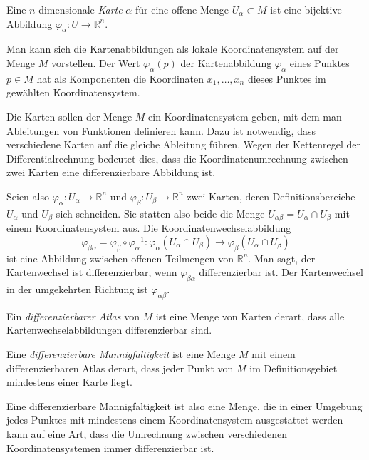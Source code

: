 \begin{definition}
\label{buch:gruppen:gruppe:def:karte}
Eine $n$-dimensionale {\em Karte} $\alpha$ für eine offene Menge
$U_\alpha\subset M$ ist eine bijektive Abbildung
$\varphi_\alpha\colon U\to \mathbb{R}^n$.
\end{definition}

Man kann sich die Kartenabbildungen als lokale Koordinatensystem auf der
Menge $M$ vorstellen.
Der Wert $\varphi_\alpha(p)$ der Kartenabbildung $\varphi_\alpha$
eines Punktes $p\in M$ hat als Komponenten die Koordinaten $x_1,\dots,x_n$
dieses Punktes im gewählten Koordinatensystem.

Die Karten sollen der Menge $M$ ein Koordinatensystem geben, mit dem
man Ableitungen von Funktionen definieren kann.
Dazu ist notwendig, dass verschiedene Karten auf die gleiche
Ableitung führen.
Wegen der Kettenregel der Differentialrechnung bedeutet dies, dass
die Koordinatenumrechnung zwischen zwei Karten eine differenzierbare
Abbildung ist.

Seien also
$\varphi_\alpha\colon U_\alpha \to \mathbb{R}^n$
und
$\varphi_\beta\colon U_\beta \to \mathbb{R}^n$
zwei Karten, deren Definitionsbereiche $U_\alpha$ und $U_\beta$ sich
schneiden.
Sie statten also beide die Menge $U_{\alpha\beta}=U_\alpha\cap U_\beta$
mit einem Koordinatensystem aus.
Die Koordinatenwechselabbildung
\[
\varphi_{\beta\alpha}
=
\varphi_\beta
\circ
\varphi_\alpha^{-1}
\colon
\varphi_\alpha(U_\alpha\cap U_\beta)
\to
\varphi_\beta(U_\alpha\cap U_\beta)
\]
ist eine Abbildung zwischen offenen Teilmengen von $\mathbb{R}^n$.
Man sagt, der Kartenwechsel ist differenzierbar, wenn $\varphi_{\beta\alpha}$
differenzierbar ist.
Der Kartenwechsel in der umgekehrten Richtung ist $\varphi_{\alpha\beta}$.

\begin{definition}
\label{buch:gruppen:gruppe:def:atlas}
Ein {\em differenzierbarer Atlas} von $M$ ist eine Menge von Karten derart,
dass alle Kartenwechselabbildungen differenzierbar sind.
\end{definition}

\begin{definition}
\label{buch:gruppen:gruppe:def:diffman}
Eine {\em differenzierbare Mannigfaltigkeit} ist eine Menge $M$ mit einem
differenzierbaren Atlas derart, dass jeder Punkt von $M$ im
Definitionsgebiet mindestens einer Karte liegt.
\end{definition}

Eine differenzierbare Mannigfaltigkeit ist also eine Menge, die in
einer Umgebung jedes Punktes mit mindestens einem Koordinatensystem
ausgestattet werden kann auf eine Art, dass die Umrechnung zwischen
verschiedenen Koordinatensystemen immer differenzierbar ist.

